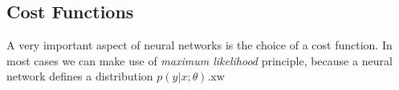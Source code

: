 \subsection{Cost Functions}
A very important aspect of neural networks is the choice of a cost function.
In most cases we can make use of \emph{maximum likelihood} principle, because a neural network defines a distribution \(p(y \vert x ; \theta)\).xw